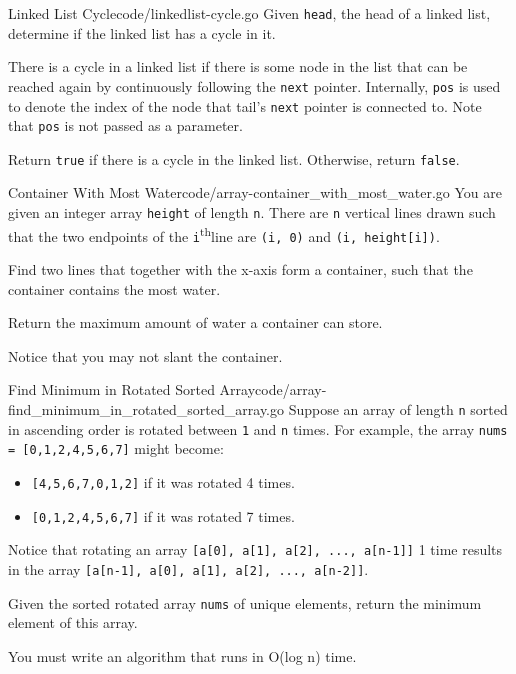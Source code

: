 \documentclass[10pt]{report}
\newcommand{\nth}[0]{\textsuperscript{th}\space}
\newcommand{\var}[1]{\texttt{#1}}
\begin{document}
\begin{problem}{Linked List Cycle}{code/linkedlist-cycle.go}
Given \var{head}, the head of a linked list, determine if the linked list has a cycle in it.

There is a cycle in a linked list if there is some node in the list that can be reached again by continuously following the \var{next} pointer. Internally, \var{pos} is used to denote the index of the node that tail's \var{next} pointer is connected to. Note that \var{pos} is not passed as a parameter.

Return \var{true} if there is a cycle in the linked list. Otherwise, return \var{false}.
\end{problem}

\begin{problem}{Container With Most Water}{code/array-container_with_most_water.go}
You are given an integer array \var{height} of length \var{n}. There are \var{n} vertical lines drawn such that the two endpoints of the \var{i}\nth line are \var{(i, 0)} and \var{(i, height[i])}.

Find two lines that together with the x-axis form a container, such that the container contains the most water.

Return the maximum amount of water a container can store.

Notice that you may not slant the container.
\end{problem}

\begin{problem}{Find Minimum in Rotated Sorted Array}{code/array-find_minimum_in_rotated_sorted_array.go}
Suppose an array of length \var{n} sorted in ascending order is rotated between \var{1} and \var{n} times. For example, the array \var{nums = [0,1,2,4,5,6,7]} might become:

\begin{itemize}
    \item \var{[4,5,6,7,0,1,2]} if it was rotated 4 times.
    \item \var{[0,1,2,4,5,6,7]} if it was rotated 7 times.
\end{itemize}

Notice that rotating an array \var{[a[0], a[1], a[2], ..., a[n-1]]} 1 time results in the array \var{[a[n-1], a[0], a[1], a[2], ..., a[n-2]]}.

Given the sorted rotated array \var{nums} of unique elements, return the minimum element of this array.

You must write an algorithm that runs in O(log n) time.
\end{problem}
\end{document}
